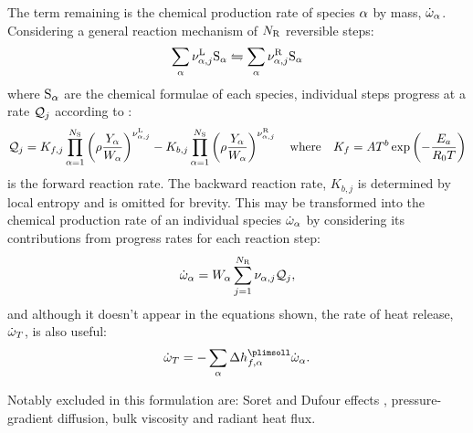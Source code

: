 The term remaining is the chemical production rate of species $\a$ by mass, $\dot{\w}_\a$. Considering a general reaction mechanism of $N_{\rm{R}}$ reversible steps:
\begin{equation}
\sum_\a \nu_{\a, j}^{\rm{L}} \rm{S}_\a \leftrightharpoons \sum_\a \nu_{\a, j}^{\rm{R}} \rm{S}_\a
\end{equation}
where $\rm{S}_\a$ are the chemical formulae of each species, individual steps progress at a rate $\cl{Q}_j$ according to \cite{poinsot2005TheoreticalNumericalCombustion}:
\begin{equation}
\cl{Q}_j = K_{f, j}\prod_{\a = 1}^{N_{\rm{S}}} \left(\r \frac{Y_\a}{W_\a}\right)^{\nu_{\a, j}^{\rm{L}}} - K_{b, j}\prod_{\a = 1}^{N_{\rm{S}}} \left(\r \frac{Y_\a}{W_\a}\right)^{\nu_{\a, j}^{\rm{R}}}
\quad \text{where} \quad
K_{f} = A T^b \exp\left(-\frac{E_a}{R_0 T}\right)
\end{equation}
is the forward reaction rate. The backward reaction rate, $K_{b, j}$ is determined by local entropy and is omitted for brevity. This may be transformed into the chemical production rate of an individual species $\dot{\w}_\a$ by considering its contributions from progress rates for each reaction step:
\begin{equation}
\dot{\w}_\a = W_\a \sum_{j = 1}^{N_\rm{R}} \nu_{\a, j} \cl{Q}_j,
\end{equation}
and although it doesn't appear in the equations shown, the rate of heat release, $\dot{\w}_T$, is also useful:
\begin{equation}
\dot{\w}_T = -\sum_\a \D h_{f, \a}^\plimsoll \dot{\w}_\a.
\end{equation}

Notably excluded in this formulation \cite{williams1985CombustionTheory} are: Soret and Dufour effects \cite{dufour1872DiffusionThermoeffect, mortimer1980ElementaryTransitionState, soret1879LetatDequilibreQue, kohler2016SoretEffectLiquid}, pressure-gradient diffusion, bulk viscosity \cite{buresti2015NoteStokesHypothesis} and radiant heat flux.





